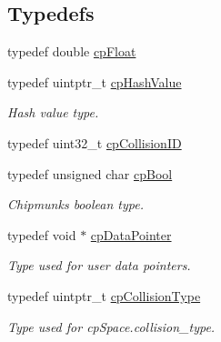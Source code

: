 \subsection*{Typedefs}
\begin{DoxyCompactItemize}
\item 
typedef double \mbox{\hyperlink{group__basic_types_gac1ed65573e035bf892505768c852d8d3}{cp\+Float}}
\item 
\mbox{\label{group__basic_types_gae7eb4775a9f43914a15553ca65a048f4}} 
typedef uintptr\+\_\+t \mbox{\hyperlink{group__basic_types_gae7eb4775a9f43914a15553ca65a048f4}{cp\+Hash\+Value}}
\begin{DoxyCompactList}\small\item\em Hash value type. \end{DoxyCompactList}\item 
typedef uint32\+\_\+t \mbox{\hyperlink{group__basic_types_ga89d4043ca0567e947aaca19cf9600df5}{cp\+Collision\+ID}}
\item 
\mbox{\label{group__basic_types_gabc5e752c48f3449ca26ef413ecbd647e}} 
typedef unsigned char \mbox{\hyperlink{group__basic_types_gabc5e752c48f3449ca26ef413ecbd647e}{cp\+Bool}}
\begin{DoxyCompactList}\small\item\em Chipmunk\textquotesingle{}s boolean type. \end{DoxyCompactList}\item 
\mbox{\label{group__basic_types_ga2ac2c3c31e21893941f9e4f8ee279447}} 
typedef void $\ast$ \mbox{\hyperlink{group__basic_types_ga2ac2c3c31e21893941f9e4f8ee279447}{cp\+Data\+Pointer}}
\begin{DoxyCompactList}\small\item\em Type used for user data pointers. \end{DoxyCompactList}\item 
\mbox{\label{group__basic_types_gae83e2f50965eb441e36ffff1e32e6d02}} 
typedef uintptr\+\_\+t \mbox{\hyperlink{group__basic_types_gae83e2f50965eb441e36ffff1e32e6d02}{cp\+Collision\+Type}}
\begin{DoxyCompactList}\small\item\em Type used for cp\+Space.\+collision\+\_\+type. \end{DoxyCompactList}\item 

\end{DoxyCompactItemize}
